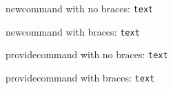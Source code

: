 \documentclass[]{article}
\begin{document}
\newcommand\nttnob{\tt}
\newcommand{\nttb}{\tt}
\providecommand\pttnob{\tt}
\providecommand{\pttb}{\tt}

newcommand with no braces: {\nttnob text}

newcommand with braces: {\nttb text}

providecommand with no braces: {\pttnob text}

providecommand with braces: {\pttb text}
\end{document}
